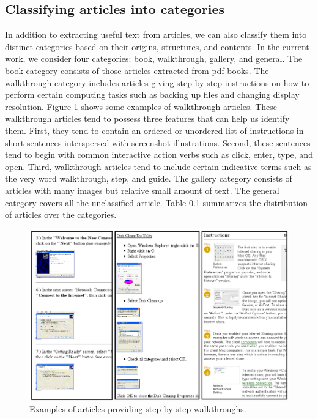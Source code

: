\documentclass{www2010-submission}
\begin{document}
\subsection{Classifying articles into categories}

In addition to extracting useful text from articles, we can also
classify them into distinct categories based on their origins,
structures, and contents.  In the current work, we consider four
categories: book, walkthrough, gallery, and general. The book category
consists of those articles extracted from pdf books. The walkthrough
category includes articles giving step-by-step instructions on how to
perform certain computing tasks such as backing up files and changing
display resolution. Figure \ref{fig:example_walkthrough} shows some
examples of walkthrough articles. These walkthrough articles tend to
possess three features that can help us identify them. First, they
tend to contain an ordered or unordered list of instructions in short
sentences interspersed with screenshot illustrations.  Second, these
sentences tend to begin with common interactive action verbs such as
click, enter, type, and open. Third, walkthrough articles tend to
include certain indicative terms such as the very word walkthrough,
step, and guide. The gallery category consists of articles with many
images but relative small amount of text. The general category covers
all the unclassified article. Table \ref{} summarizes the 
distribution of articles over the categories. 

\begin{figure}
\includegraphics[width=1\columnwidth]{figure/walkthrough_examples.png}
\caption{Examples of articles providing step-by-step walkthroughs.}
\label{fig:example_walkthrough}
\end{figure}
\end{document}
